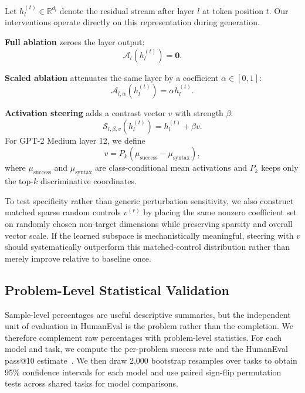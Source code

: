 \documentclass[preprint,12pt,authoryear]{elsarticle}
\begin{document}
Let $h_l^{(t)} \in \mathbb{R}^{d_l}$ denote the residual stream after layer $l$ at token position $t$. Our interventions operate directly on this representation during generation.

\textbf{Full ablation} zeroes the layer output:
\begin{equation}
\mathcal{A}_{l}(h_l^{(t)}) = \mathbf{0}.
\end{equation}

\textbf{Scaled ablation} attenuates the same layer by a coefficient $\alpha \in [0,1]$:
\begin{equation}
\mathcal{A}_{l,\alpha}(h_l^{(t)}) = \alpha h_l^{(t)}.
\end{equation}

\textbf{Activation steering} adds a contrast vector $v$ with strength $\beta$:
\begin{equation}
\mathcal{S}_{l,\beta,v}(h_l^{(t)}) = h_l^{(t)} + \beta v.
\end{equation}
For GPT-2 Medium layer 12, we define
\begin{equation}
v = P_k\!\left(\mu_{\mathrm{success}} - \mu_{\mathrm{syntax}}\right),
\end{equation}
where $\mu_{\mathrm{success}}$ and $\mu_{\mathrm{syntax}}$ are class-conditional mean activations and $P_k$ keeps only the top-$k$ discriminative coordinates.

To test specificity rather than generic perturbation sensitivity, we also construct matched sparse random controls $v^{(r)}$ by placing the same nonzero coefficient set on randomly chosen non-target dimensions while preserving sparsity and overall vector scale. If the learned subspace is mechanistically meaningful, steering with $v$ should systematically outperform this matched-control distribution rather than merely improve relative to baseline once.

\subsection{Problem-Level Statistical Validation}

Sample-level percentages are useful descriptive summaries, but the independent unit of evaluation in HumanEval is the problem rather than the completion. We therefore complement raw percentages with problem-level statistics. For each model and task, we compute the per-problem success rate and the HumanEval pass@10 estimate~\cite{chen2021humaneval}. We then draw 2,000 bootstrap resamples over tasks to obtain 95\% confidence intervals for each model and use paired sign-flip permutation tests across shared tasks for model comparisons.
\end{document}
